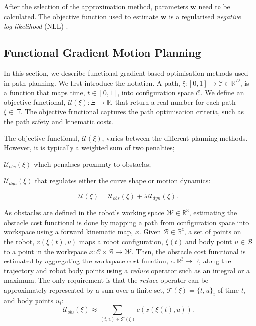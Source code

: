 \documentclass[letterpaper, 10 pt, conference]{ieeeconf}  %
\begin{document}
After the selection of the approximation method, parameters $\boldsymbol{w}$ need to be calculated. The objective function used to estimate $\boldsymbol{w}$ is a regularised \textit{negative log-likelihood} (NLL) \cite{ramos2015hilbert}.

\subsection{Functional Gradient Motion Planning} \label{subsec:FGMP}
In this section, we describe functional gradient based optimisation methods used in path planning. 
We first introduce the notation. A path, $\xi: [0,1] \rightarrow \mathcal{C}\in\mathbb{R}^D$, is a function that maps time, $t \in [0,1]$, into configuration space $\mathcal{C}$. We define an objective functional, $\mathcal{U}(\xi): \Xi \rightarrow \mathbb{R}$, that return a real number for each path $\xi \in \Xi$. The objective functional captures the path optimisation criteria, such as the path safety and kinematic costs. 

The objective functional, $\mathcal{U}(\xi)$, varies between the different planning methods. However, it is typically a weighted sum of two penalties; \begin{inparaenum}[(i)]  
 	\item $\mathcal{U}_{obs}(\xi)$ which penalises proximity to obstacles;
 	\item $\mathcal{U}_{dyn}(\xi)$ that regulates either the curve shape or motion dynamics:
 \end{inparaenum}   
\begin{equation}\label{eq:FPMP_U}
\mathcal{U}(\xi) = \mathcal{U}_{obs}(\xi) + \lambda\mathcal{U}_{dyn}(\xi).
\end{equation}

As obstacles are defined in the robot's working space $\mathcal{W} \in \mathbb{R}^3$, estimating the obstacle cost functional is done by mapping a path from configuration space into workspace using a forward kinematic map, $x$. Given $\mathcal{B} \in \mathbb{R}^3$, a set of points on the robot, $x\left(\xi(t),u\right)$ maps a robot configuration, $\xi(t)$ and body point $u \in \mathcal{B}$ to a point in the workspace $x: \mathcal{C} \times \mathcal{B} \rightarrow \mathcal{W}$. Then, the obstacle cost functional is estimated by aggregating the workspace cost function, $c: \mathbb{R}^3 \rightarrow \mathbb{R}$, along the trajectory and robot body points using a \textit{reduce} operator such as an integral or a maximum. The only requirement is that the \textit{reduce} operator can be approximately represented by a sum over a finite set, $\mathcal{T}(\xi) = \{t,u\}_i$ of time $t_i$ and body points $u_i$:
\begin{equation}\label{eq:FGMP_Uobs}
\mathcal{U}_{obs}(\xi) \approx \sum_{(t,u)\in\mathcal{T}(\xi)} c\left(x\left(\xi(t),u\right)\right).
\end{equation}
\end{document}
